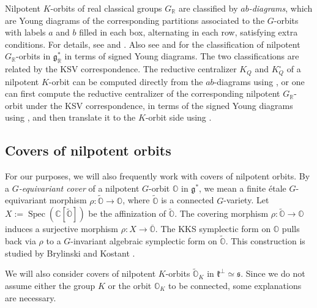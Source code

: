 \documentclass[11pt, a4paper]{amsart}
\newcommand{\C}{\mathbb{C}}
\newcommand{\g}{\mathfrak{g}}
\newcommand{\orb}{\mathbb{O}}
\newcommand{\orbk}{\orb_{K}}
\newcommand{\torbk}{\widetilde{\orb}_{K}}
\newcommand{\fg}{\mathfrak{g}}
\newcommand{\fk}{\mathfrak{k}}
\newcommand{\fs}{\mathfrak{s}}
\newcommand{\R}{\mathbb{R}}
\newcommand{\GR}{G_\R}
\newcommand{\spec}{\operatorname{Spec}}
\theoremstyle{definition}
\numberwithin{equation}{section}
\begin{document}
Nilpotent $K$-orbits of real classical groups $\GR$ are classified by \emph{$ab$-diagrams}, which are Young diagrams of the corresponding partitions associated to the $G$-orbits with labels $a$ and $b$ filled in each box, alternating in each row, satisfying extra conditions. For details, see \cite{Kraft-Procesi:normal} and \cite{Ohta:Adm}. Also see \cite[Section 9.3]{CM} and \cite[Proposition 3.5]{GomezZhu:local_theta_lifting} for the classification of nilpotent $\GR$-orbits in $\g_\R^*$ in terms of signed Young diagrams. The two classifications are related by the KSV correspondence. The reductive centralizer $K_Q$ and $K_Q^\circ$ of a nilpotent $K$-orbit can be computed directly from the $ab$-diagrams using \cite{Ohta:Adm}, or one can first compute the reductive centralizer of the corresponding nilpotent $\GR$-orbit under the KSV correspondence, in terms of the signed Young diagrams using \cite[(3.7)]{GomezZhu:local_theta_lifting}, and then translate it to the $K$-orbit side using \cite[Remark 9.5.2]{CM}. 



\subsection{Covers of nilpotent orbits} \label{subsec:orbit_covers}

For our purposes, we will also frequently work with covers of nilpotent orbits. By a \emph{$G$-equivariant cover} of a nilpotent $G$-orbit $\orb$ in $\fg^*$, we mean a finite \'etale $G$-equivariant morphism $\rho: \widetilde{\orb} \to \orb$, where $\widetilde{\orb}$ is a connected $G$-variety. Let $X := \spec(\C[\widetilde{\orb}])$ be the affinization of $\widetilde{\orb}$. The covering morphism $\rho: \widetilde{\orb} \to \orb$ induces a surjective morphism $\rho: X \to \overline{\orb}$. The KKS symplectic form on $\orb$ pulls back via $\rho$ to a $G$-invariant algebraic symplectic form on $\widetilde{\orb}$. This construction is studied by Brylinski and Kostant \cite{Brylinski-Kostant}. 




We will also consider covers of nilpotent $K$-orbits $\torbk$ in $\fk^\perp \simeq \fs$. Since we do not assume either the group $K$ or the orbit $\orbk$ to be connected, some explanations are necessary.
\end{document}
